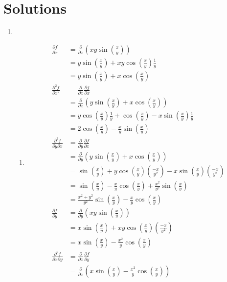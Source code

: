 \documentclass{article}
\begin{document}
\section*{Solutions}
\begin{enumerate}

\item
\begin{enumerate}

 \item
  \begin{align*}
   \frac{\partial f}{\partial x}
   &= \frac{\partial}{\partial x}(xy \sin(\frac{x}{y})) \\
   &= y\sin(\frac{x}{y}) + xy\cos(\frac{x}{y})\frac{1}{y} \\
   &= y\sin(\frac{x}{y}) + x\cos(\frac{x}{y}) \\
   \frac{\partial^2 f}{\partial x^2}
   &= \frac{\partial}{\partial x}\frac{\partial f}{\partial x} \\
   &= \frac{\partial}{\partial x}(y\sin(\frac{x}{y}) + x\cos(\frac{x}{y})) \\
   &= y\cos(\frac{x}{y})\frac{1}{y} + \cos(\frac{x}{y}) - x\sin(\frac{x}{y})\frac{1}{y} \\
   &= 2\cos(\frac{x}{y}) - \frac{x}{y}\sin(\frac{x}{y}) \\
  \frac{\partial^2 f}{\partial y \partial x}
   &= \frac{\partial}{\partial y}\frac{\partial f}{\partial x} \\
   &= \frac{\partial}{\partial y}(y\sin(\frac{x}{y}) + x\cos(\frac{x}{y})) \\
   &= \sin(\frac{x}{y}) + y\cos(\frac{x}{y})(\frac{-x}{y^2}) - x\sin(\frac{x}{y})(\frac{-x}{y^2}) \\
   &= \sin(\frac{x}{y}) - \frac{x}{y}\cos(\frac{x}{y}) + \frac{x^2}{y^2}\sin(\frac{x}{y}) \\
   &= \frac{x^2+y^2}{y^2}\sin(\frac{x}{y}) - \frac{x}{y}\cos(\frac{x}{y}) \\
   \frac{\partial f}{\partial y}
   &= \frac{\partial}{\partial y}(xy \sin(\frac{x}{y})) \\
   &= x\sin(\frac{x}{y}) + xy\cos(\frac{x}{y})(\frac{-x}{y^2}) \\
   &= x\sin(\frac{x}{y}) - \frac{x^2}{y}\cos(\frac{x}{y}) \\
   \frac{\partial^2 f}{\partial x \partial y}
   &= \frac{\partial}{\partial x}\frac{\partial f}{\partial y} \\
   &= \frac{\partial}{\partial x}(x\sin(\frac{x}{y}) - \frac{x^2}{y}\cos(\frac{x}{y})) \\

\end{align*}
\end{enumerate}
\end{enumerate}
\end{document}
